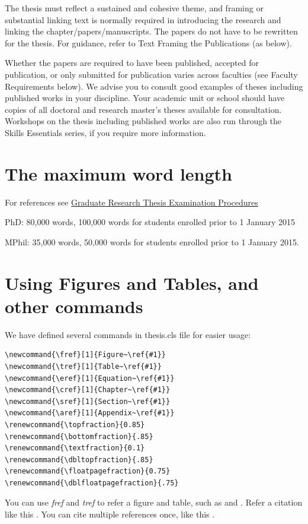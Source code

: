 The thesis must reflect a sustained and cohesive theme, and framing or substantial linking text is normally required in introducing the research and linking the chapter/papers/manuscripts. The papers do not have to be rewritten for the thesis. For guidance, refer to Text Framing the Publications (as below).

Whether the papers are required to have been published, accepted for publication, or only submitted for publication varies across faculties (see Faculty Requirements below). We advise you to consult good examples of theses including published works in your discipline. Your academic unit or school should have copies of all doctoral and research master's theses available for consultation. Workshops on the thesis including published works are also run through the Skills Essentials series, if you require more information.


\section{The maximum word length}
For references see \href{http://www.monash.edu/__data/assets/pdf_file/0011/911882/Graduate-Research-Thesis-Examination-Procedures.pdf}{Graduate Research Thesis Examination Procedures} 

PhD: 80,000 words,  100,000 words for students enrolled prior to 1 January 2015

MPhil: 35,000 words, 50,000 words for students enrolled prior to 1 January 2015.

\section{Using Figures and Tables, and other commands}

We have defined several commands in thesis.cls file for easier usage:
\begin{verbatim}
\newcommand{\fref}[1]{Figure~\ref{#1}}
\newcommand{\tref}[1]{Table~\ref{#1}}
\newcommand{\eref}[1]{Equation~\ref{#1}}
\newcommand{\cref}[1]{Chapter~\ref{#1}}
\newcommand{\sref}[1]{Section~\ref{#1}}
\newcommand{\aref}[1]{Appendix~\ref{#1}}
\renewcommand{\topfraction}{0.85}
\renewcommand{\bottomfraction}{.85}
\renewcommand{\textfraction}{0.1}
\renewcommand{\dbltopfraction}{.85}
\renewcommand{\floatpagefraction}{0.75}
\renewcommand{\dblfloatpagefraction}{.75}
\end{verbatim}

You can use \textit{fref} and \textit{tref} to refer a figure and table, such as  and . Refer a citation like this \cite{Reference1}. You can cite multiple references once, like this \cite{Reference1,Reference2,Reference3}.




